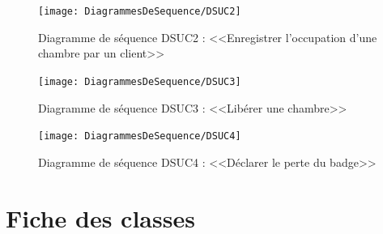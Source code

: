 \documentclass[11pt,article]{article}
\begin{document}
\newpage

\begin{figure}[h!]
  \texttt{[image: DiagrammesDeSequence/DSUC2]}
  \caption{Diagramme de séquence DSUC2 : <<Enregistrer l'occupation d'une chambre par un client>>}
  \label{umlet_diag_seq2}
\end{figure}

\newpage

\begin{figure}[h!]
  \texttt{[image: DiagrammesDeSequence/DSUC3]}
  \caption{Diagramme de séquence DSUC3 : <<Libérer une chambre>>}
  \label{umlet_diag_seq3}
\end{figure}

\newpage

\begin{figure}[h!]
  \texttt{[image: DiagrammesDeSequence/DSUC4]}
  \caption{Diagramme de séquence DSUC4 : <<Déclarer le perte du badge>>}
  \label{umlet_diag_seq4}
\end{figure}
\newpage

\section{Fiche des classes}
\end{document}
